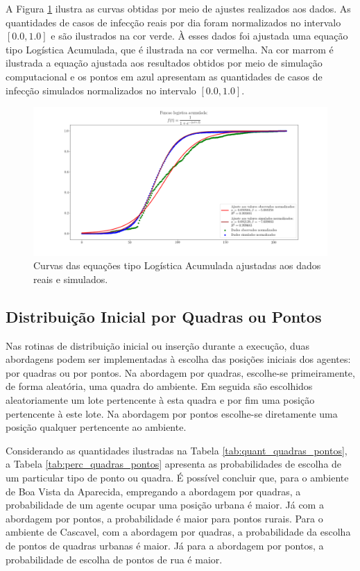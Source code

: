 A Figura \ref{fig:funcoes_logistica} ilustra as curvas obtidas por meio de ajustes realizados aos dados. As quantidades de casos de infecção reais por dia foram normalizados no intervalo $[0.0, 1.0]$ e são ilustrados na cor verde. À esses dados foi ajustada uma equação tipo Logística Acumulada, que é ilustrada na cor vermelha. Na cor marrom é ilustrada a equação ajustada aos resultados obtidos por meio de simulação computacional e os pontos em azul apresentam as quantidades de casos de infecção simulados normalizados no intervalo $[0.0, 1.0]$. 

\begin{figure}[H]
  \centering
  \includegraphics[width=1\textwidth]{Figuras/Observacoes/Logistica.png}
  \caption{Curvas das equações tipo Logística Acumulada ajustadas aos dados reais e simulados. }
  \label{fig:funcoes_logistica}
\end{figure} 

\subsection{Distribuição Inicial por Quadras ou Pontos}

Nas rotinas de distribuição inicial ou inserção durante a execução, duas abordagens podem ser implementadas à escolha das posições iniciais dos agentes: por quadras ou por pontos. Na abordagem por quadras, escolhe-se primeiramente, de forma aleatória, uma quadra do ambiente. Em seguida são escolhidos aleatoriamente um lote pertencente à esta quadra e por fim uma posição pertencente à este lote. Na abordagem por pontos escolhe-se diretamente uma posição qualquer pertencente ao ambiente. 

Considerando as quantidades ilustradas na Tabela \ref{tab:quant_quadras_pontos}, a Tabela \ref{tab:perc_quadras_pontos} apresenta as probabilidades de escolha de um particular tipo de ponto ou quadra. É possível concluir que, para o ambiente de Boa Vista da Aparecida, empregando a abordagem por quadras, a probabilidade de um agente ocupar uma posição urbana é maior. Já com a abordagem por pontos, a probabilidade é maior para pontos rurais. Para o ambiente de Cascavel, com a abordagem por quadras, a probabilidade da escolha de pontos de quadras urbanas é maior. Já para a abordagem por pontos, a probabilidade de escolha de pontos de rua é maior. 

